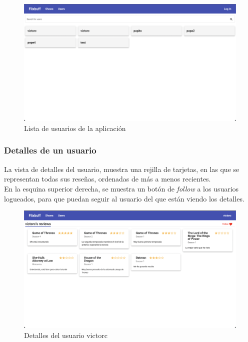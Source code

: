 \begin{figure}[H]
    \centering	
        \includegraphics[scale=0.25]{img/user-list.png}
    \caption{ Lista de usuarios de la aplicación }\label{fig:user-list}
\end{figure}

\subsubsection{Detalles de un usuario}
La vista de detalles del usuario, muestra una rejilla de tarjetas, en las que se representan todas sus reseñas,
ordenadas de más a menos recientes.\\

En la esquina superior derecha, se muestra un botón de \textit{follow} a los usuarios logueados, para que puedan seguir
al usuario del que están viendo los detalles.\\

\begin{figure}[H]
    \centering	
        \includegraphics[scale=0.25]{img/user-details.png}
    \caption{ Detalles del usuario victorc }\label{fig:user-details}
\end{figure}

